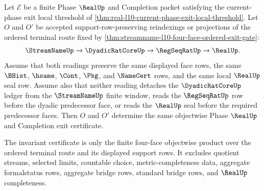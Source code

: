 \begin{theorem}
\label{thm:real-l10-face-order-permutation-invariance}
Let $\mathcal E$ be a finite Phase $\RealUp$ and Completion packet satisfying the current-phase exit local threshold of \autoref{thm:real-l10-current-phase-exit-local-threshold}. Let $O$ and $O'$ be accepted support-row-preserving reindexings or projections of the ordered terminal route fixed by \autoref{thm:streamname-l10-four-face-ordered-exit-gate}:
$$
\StreamNameUp \to \DyadicRatCoreUp \to \RegSeqRatUp \to \RealUp .
$$
Assume that both readings preserve the same displayed face rows, the same $\BHist$, $\hsame$, $\Cont$, $\Pkg$, and $\NameCert$ rows, and the same local $\RealUp$ seal row. Assume also that neither reading detaches the $\DyadicRatCoreUp$ ledger from the $\StreamNameUp$ finite window, reads the $\RegSeqRatUp$ row before the dyadic predecessor face, or reads the $\RealUp$ seal before the required predecessor faces. Then $O$ and $O'$ determine the same objectwise Phase $\RealUp$ and Completion exit certificate.

The invariant certificate is only the finite four-face objectwise product over the ordered terminal route and its displayed support rows. It excludes quotient streams, selected limits, countable choice, metric-completeness data, aggregate formalstatus rows, aggregate bridge rows, standard bridge rows, and $\RealUp$ completeness.
\end{theorem}
